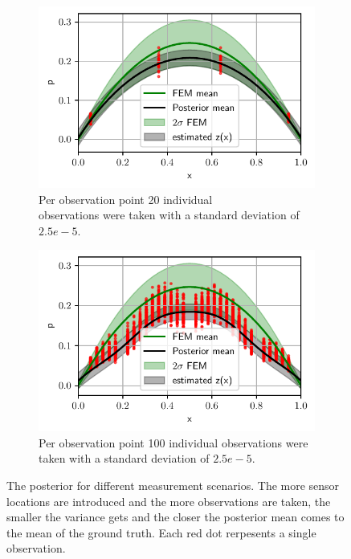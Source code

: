 \documentclass[%
  a4paper,oneside,%
  11pt,%
  smallchapters,
  style=printdev,
  extramargin,
  green,%
  rgb, <cmyk>
  ]{tubsbook}
\begin{document}
\begin{figure}[!ht]
	\begin{subfigure}[t]{.5\textwidth}
	\centering
	\includegraphics[width=1\linewidth]{../../Python/Results/1D/Model_Error/20o_4s/Result.pdf}
	\caption{Per observation point 20 individual \\
	observations were taken with a standard deviation of $2.5e-5$. }	
	\label{fig:ModelError1Dc}
	\end{subfigure}%
	\begin{subfigure}[t]{.5\textwidth}
	\centering
	\includegraphics[width=1\linewidth]{../../Python/Results/1D/Model_Error/100o_30s/Result.pdf}
	\caption{Per observation point 100 individual observations were taken with a standard deviation of $2.5e-5$. }	
	\label{fig:ModelError1Dd}
	\end{subfigure}

\caption[The posterior for the 1D example after introducing observations with a model error]{The posterior for different measurement scenarios. The more sensor locations are introduced and the more observations are taken, the smaller the variance gets and the closer the posterior mean comes to the mean of the ground truth. Each red dot rerpesents a single observation.}	
	
\label{fig:ModelError1D}
\end{figure}
\end{document}
